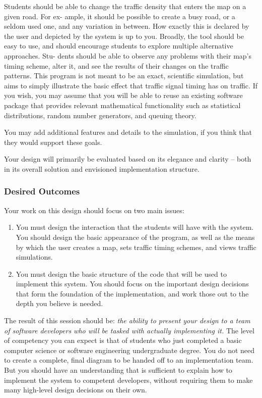 \begin{enumerate}
Students should be able to change the traffic density that enters the map on a given road. For ex- ample, it should be possible to create a busy road, or a seldom used one, and any variation in between. How exactly this is declared by the user and depicted by the system is up to you. Broadly, the tool should be easy to use, and should encourage students to explore multiple alternative approaches. Stu- dents should be able to observe any problems with their map's timing scheme, alter it, and see the results of their changes on the traffic patterns. This program is not meant to be an exact, scientific simulation, but aims to simply illustrate the basic effect that traffic signal timing has on traffic. If you wish, you may assume that you will be able to reuse an existing software package that provides relevant mathematical functionality such as statistical distributions, random number generators, and queuing theory.
\end{enumerate}

You may add additional features and details to the simulation, if you think that they would support these goals.

Your design will primarily be evaluated based on its elegance and clarity – both in its overall solution and envisioned implementation structure.

\subsubsection*{Desired Outcomes}

Your work on this design should focus on two main issues:

\begin{enumerate}
\item
You must design the interaction that the students will have with the system. You should design the basic appearance of the program, as well as the means by which the user creates a map, sets traffic timing schemes, and views traffic simulations.
\item
You must design the basic structure of the code that will be used to implement this system. You should focus on the important design decisions that form the foundation of the implementation, and work those out to the depth you believe is needed.
\end{enumerate}

The result of this session should be: \emph{the ability to present your design to a team of software developers who will be tasked with actually implementing it.} The level of competency you can expect is that of students who just completed a basic computer science or software engineering undergraduate degree. You do not need to create a complete, final diagram to be handed off to an implementation team. But you should have an understanding that is sufficient to explain how to implement the system to competent developers, without requiring them to make many high-level design decisions on their own.

